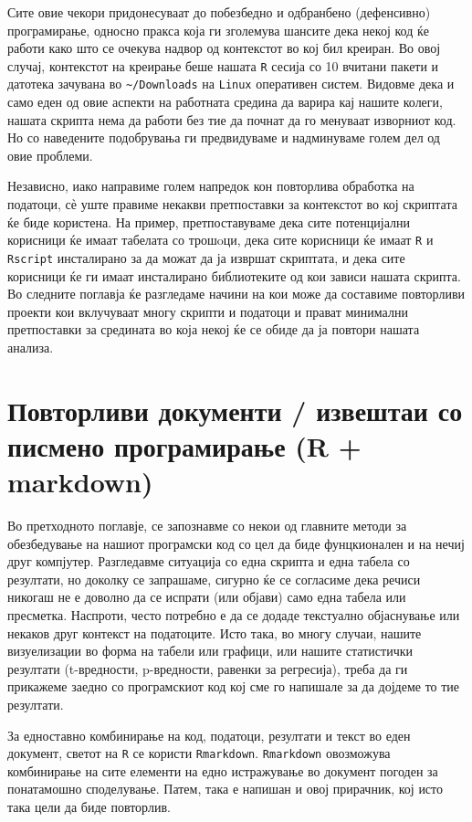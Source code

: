\documentclass[
]{book}
\begin{document}
Сите овие чекори придонесуваат до побезбедно и одбранбено (дефенсивно) програмирање, односно пракса која ги зголемува шансите дека некој код ќе работи како што се очекува надвор од контекстот во кој бил креиран. Во овој случај, контекстот на креирање беше нашата \texttt{R} сесија со 10 вчитани пакети и датотека зачувана во \texttt{\textasciitilde{}/Downloads} на \texttt{Linux} оперативен систем. Видовме дека и само еден од овие аспекти на работната средина да варира кај нашите колеги, нашата скрипта нема да работи без тие да почнат да го менуваат изворниот код. Но со наведените подобрувања ги предвидуваме и надминуваме голем дел од овие проблеми.

Независно, иако направиме голем напредок кон повторлива обработка на податоци, сѐ уште правиме некакви претпоставки за контекстот во кој скриптата ќе биде користена. На пример, претпоставуваме дека сите потенцијални корисници ќе имаат табелата со трошoци, дека сите корисници ќе имаат \texttt{R} и \texttt{Rscript} инсталирано за да можат да ја извршат скриптата, и дека сите корисници ќе ги имаат инсталирано библиотеките од кои зависи нашата скрипта. Во следните поглавја ќе разгледаме начини на кои може да составиме повторливи проекти кои вклучуваат многу скрипти и податоци и прават минимални претпоставки за средината во која некој ќе се обиде да ја повтори нашата анализа.

\hypertarget{rmd}{%
\chapter{Повторливи документи / извештаи со писмено програмирање (R + markdown)}\label{rmd}}

Во претходното поглавје, се запознавме со некои од главните методи за обезбедување на нашиот програмски код со цел да биде фунцкионален и на нечиј друг компјутер. Разгледавме ситуација со една скрипта и една табела со резултати, но доколку се запрашаме, сигурно ќе се согласиме дека речиси никогаш не е доволно да се испрати (или објави) само една табела или пресметка. Наспроти, често потребно е да се додаде текстуално објаснување или некаков друг контекст на податоците. Исто така, во многу случаи, нашите визуелизации во форма на табели или графици, или нашите статистички резултати (t-вредности, p-вредности, равенки за регресија), треба да ги прикажеме заедно со програмскиот код кој сме го напишале за да дојдеме то тие резултати.

За едноставно комбинирање на код, податоци, резултати и текст во еден документ, светот на \texttt{R} се користи \texttt{Rmarkdown}. \texttt{Rmarkdown} овозможува комбинирање на сите елементи на едно истражување во документ погоден за понатамошно споделување. Патем, така е напишан и овој прирачник, кој исто така цели да биде повторлив.
\end{document}
